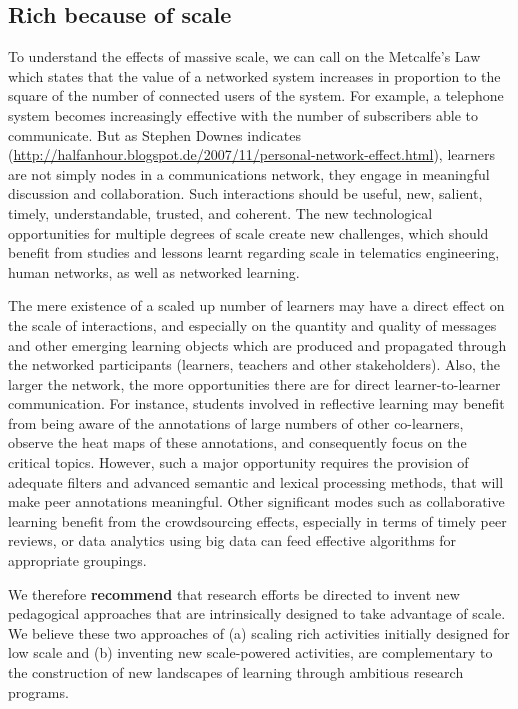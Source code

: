 \subsection{Rich because of scale}

To understand the effects of massive scale, we can call on the
Metcalfe’s Law which states that the value of a networked system
increases in proportion to the square of the number of connected users
of the system. For example, a telephone system becomes increasingly
effective with the number of subscribers able to communicate. But as
Stephen Downes indicates
(\url{http://halfanhour.blogspot.de/2007/11/personal-network-effect.html}),
learners are not simply nodes in a communications network, they engage
in meaningful discussion and collaboration. Such interactions should be
useful, new, salient, timely, understandable, trusted, and coherent. The
new technological opportunities for multiple degrees of scale create new
challenges, which should benefit from studies and lessons learnt
regarding scale in telematics engineering, human networks, as well as
networked learning.

The mere existence of a scaled up number of learners may have a direct
effect on the scale of interactions, and especially on the quantity and
quality of messages and other emerging learning objects which are
produced and propagated through the networked participants (learners,
teachers and other stakeholders). Also, the larger the network, the more
opportunities there are for direct learner-to-learner communication. For
instance, students involved in reflective learning may benefit from
being aware of the annotations of large numbers of other co-learners,
observe the heat maps of these annotations, and consequently focus on
the critical topics. However, such a major opportunity requires the
provision of adequate filters and advanced semantic and lexical
processing methods, that will make peer annotations meaningful. Other
significant modes such as collaborative learning benefit from the
crowdsourcing effects, especially in terms of timely peer reviews, or
data analytics using big data can feed effective algorithms for
appropriate groupings.

We therefore \textbf{recommend} that research efforts be directed to invent new
pedagogical approaches that are intrinsically designed to take advantage
of scale. We believe these two approaches of (a) scaling rich activities
initially designed for low scale and (b) inventing new scale-powered
activities, are complementary to the construction of new landscapes of
learning through ambitious research programs.
